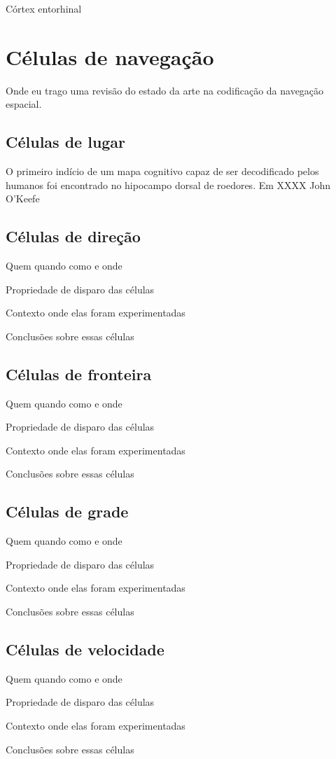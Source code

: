 Córtex entorhinal

\section{Células de navegação}
Onde eu trago uma revisão do estado da arte na codificação da navegação espacial.

\subsection{Células de lugar}
O primeiro indício de um mapa cognitivo capaz de ser decodificado pelos humanos foi encontrado no hipocampo dorsal de roedores.
Em XXXX John O'Keefe 


\subsection{Células de direção}
Quem quando como e onde

Propriedade de disparo das células

Contexto onde elas foram experimentadas 

Conclusões sobre essas células

\subsection{Células de fronteira}
Quem quando como e onde

Propriedade de disparo das células

Contexto onde elas foram experimentadas 

Conclusões sobre essas células


\subsection{Células de grade}
Quem quando como e onde

Propriedade de disparo das células

Contexto onde elas foram experimentadas 

Conclusões sobre essas células


\subsection{Células de velocidade}
Quem quando como e onde

Propriedade de disparo das células

Contexto onde elas foram experimentadas 

Conclusões sobre essas células
